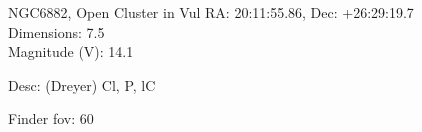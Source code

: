 \begin{block}{NGC6882, Open Cluster in Vul}
    RA: 20:11:55.86, Dec: +26:29:19.7 \\ 
    Dimensions: 7.5 \\ 
    Magnitude (V): 14.1


    Desc: (Dreyer) Cl, P, lC 

    Finder fov: 60 

     
\end{block}